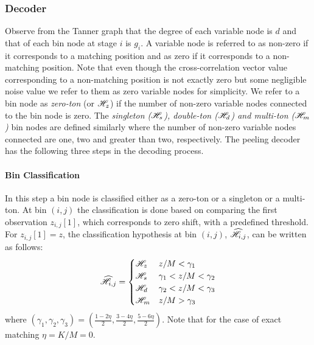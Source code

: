\subsubsection{Decoder}			
	Observe from the Tanner graph that the degree of each variable node is $d$ and that of each bin node at stage $i$ is $g_i$. A variable node is referred to as non-zero if it corresponds to a matching position and as zero if it corresponds to a non-matching position. Note that even though the cross-correlation vector value corresponding to a non-matching position is not exactly zero but some negligible noise value we refer to them as zero variable nodes for simplicity. We refer to a bin node as {\it zero-ton} (or $\mathscr{H}_z$) if the number of non-zero variable nodes connected to the bin node is zero. The {\it singleton ($\mathscr{H}_s$), double-ton ($\mathscr{H}_d$) and multi-ton ($\mathscr{H}_m$)} bin nodes are defined similarly where the number of non-zero variable nodes connected are one, two and greater than two, respectively. The peeling decoder has the following three steps in the decoding process.

\paragraph*{Bin Classification} In this step a bin node is classified either as a zero-ton or a singleton or a multi-ton. At bin $(i,j)$ the classification is done based on  comparing the first observation $z_{i,j}[1]$, which corresponds to zero shift, with a predefined threshold. For $z_{i,j}[1]=z$, the classification hypothesis at bin $(i,j)$, $\widehat{\mathscr{H}}_{i,j}$, can be written as follows:
\begin{align}
\label{Eqn:BinClassifApprox}
\widehat{\mathscr{H}}_{i,j}=
\begin{cases}
\mathscr{H}_z &  	 z/M < \gamma_1\\
\mathscr{H}_s &	  \gamma_1 < z/M < \gamma_2  \\
\mathscr{H}_d  &    \gamma_2  < z/M <  \gamma_3\\
\mathscr{H}_m &      z/M > \gamma_3\\
\end{cases}
\end{align}
where $(\gamma_1,\gamma_2,\gamma_3)=(\frac{1-2\eta}{2},\frac{3-4\eta}{2},\frac{5-6\eta}{2})$. Note that for the case of exact matching $\eta=K/M=0$.

